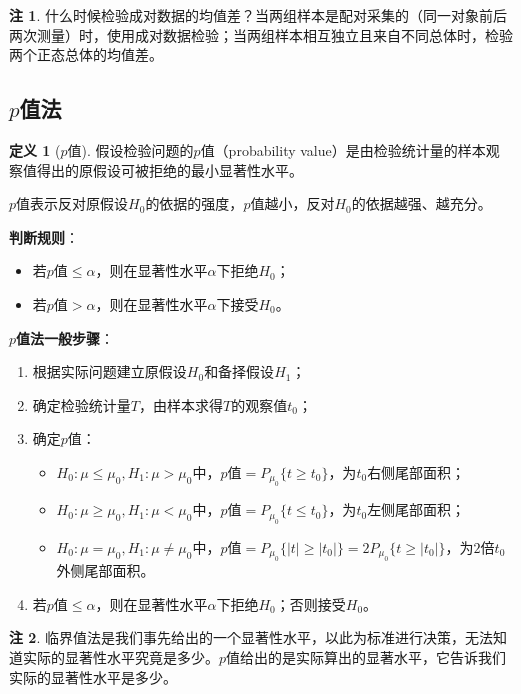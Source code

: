\documentclass[11pt,a4paper]{report}
\theoremstyle{definition}
\newtheorem{definition}{定义}[chapter]
\newtheorem{remark}{注}[chapter]
\theoremstyle{plain}
\begin{document}
\begin{remark}
什么时候检验成对数据的均值差？当两组样本是配对采集的（同一对象前后两次测量）时，使用成对数据检验；当两组样本相互独立且来自不同总体时，检验两个正态总体的均值差。
\end{remark}

\subsection{\texorpdfstring{$p$}{p}值法}

\begin{definition}[$p$值]
假设检验问题的$p$值（probability value）是由检验统计量的样本观察值得出的原假设可被拒绝的最小显著性水平。

$p$值表示反对原假设$H_0$的依据的强度，$p$值越小，反对$H_0$的依据越强、越充分。
\end{definition}

\textbf{判断规则}：
\begin{itemize}[leftmargin=2em]
    \item 若$p$值$\leq\alpha$，则在显著性水平$\alpha$下拒绝$H_0$；
    \item 若$p$值$>\alpha$，则在显著性水平$\alpha$下接受$H_0$。
\end{itemize}

\textbf{$p$值法一般步骤}：
\begin{enumerate}[label=\arabic*.,leftmargin=2em]
    \item 根据实际问题建立原假设$H_0$和备择假设$H_1$；
    \item 确定检验统计量$T$，由样本求得$T$的观察值$t_0$；
    \item 确定$p$值：
    \begin{itemize}[leftmargin=2em]
        \item $H_0:\mu\leq\mu_0,H_1:\mu>\mu_0$中，$p$值$=P_{\mu_0}\{t\geq t_0\}$，为$t_0$右侧尾部面积；
        \item $H_0:\mu\geq\mu_0,H_1:\mu<\mu_0$中，$p$值$=P_{\mu_0}\{t\leq t_0\}$，为$t_0$左侧尾部面积；
        \item $H_0:\mu=\mu_0,H_1:\mu\neq\mu_0$中，$p$值$=P_{\mu_0}\{|t|\geq|t_0|\}=2P_{\mu_0}\{t\geq|t_0|\}$，为$2$倍$t_0$外侧尾部面积。
    \end{itemize}
    \item 若$p$值$\leq\alpha$，则在显著性水平$\alpha$下拒绝$H_0$；否则接受$H_0$。
\end{enumerate}

\begin{remark}
临界值法是我们事先给出的一个显著性水平，以此为标准进行决策，无法知道实际的显著性水平究竟是多少。$p$值给出的是实际算出的显著水平，它告诉我们实际的显著性水平是多少。
\end{remark}
\end{document}
